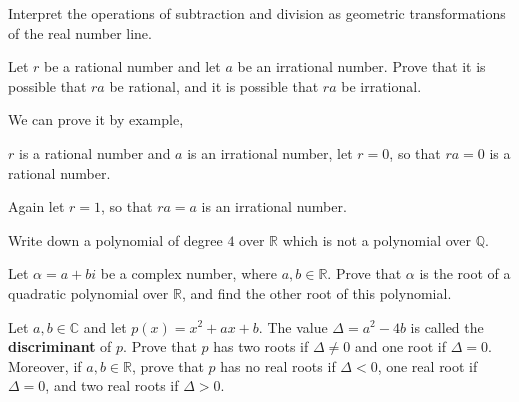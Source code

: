 \begin{exercise}
Interpret the operations of subtraction and division as geometric transformations of the real number line.
\end{exercise}


\begin{exercise}
Let $r$ be a rational number and let $a$ be an irrational number. Prove that it is possible that $ra$ be rational, and it is possible that $ra$ be irrational.
\end{exercise}

\begin{solution}
We can prove it by example,

$r$ is a rational number and $a$ is an irrational number, let $r = 0$, so that $ra=0$ is a rational number. 

Again let $r = 1$, so that $ra=a$ is an irrational number.
\end{solution}


\begin{exercise}
Write down a polynomial of degree $4$ over $\mathbb{R}$ which is not a polynomial over $\mathbb{Q}$.
\end{exercise}


\begin{exercise}
\label{exComplexNumberAsRootOfQuadraticOverR}
Let $\alpha = a+bi$ be a complex number, where $a,b \in \mathbb{R}$. Prove that $\alpha$ is the root of a quadratic polynomial over $\mathbb{R}$, and find the other root of this polynomial.
\end{exercise}


\begin{exercise}
\label{exDiscriminantRealRoots}
Let $a,b \in \mathbb{C}$ and let $p(x)=x^2+ax+b$. The value $\Delta=a^2-4b$ is called the \textbf{discriminant} of $p$. Prove that $p$ has two roots if $\Delta \ne 0$ and one root if $\Delta = 0$. Moreover, if $a,b \in \mathbb{R}$, prove that $p$ has no real roots if $\Delta < 0$, one real root if $\Delta = 0$, and two real roots if $\Delta > 0$.
\end{exercise}
